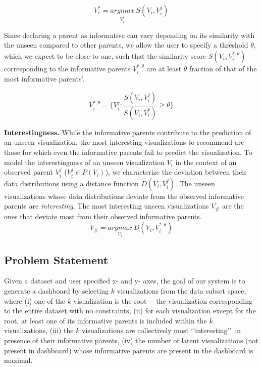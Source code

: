 \begin{equation}
    V_i^*=\underset{V_i^j}{argmax}\ S(V_i, V_i^j)
\end{equation}

Since declaring a parent as informative can vary depending on its similarity with the unseen compared to other parents, we allow the user to specify a threshold $\theta$, which we expect to be close to one, such that the similarity score $S(V_i, V_i^{*, \theta})$ corresponding to the informative parents $V_i^{*, \theta}$ are at least $\theta$ fraction of that of the most informative parents'.

\begin{equation}
    V_i^{*, \theta} = \{V_i^j : \frac{S(V_i, V_i^j)}{S(V_i, V_i^*)} \ge \theta\}
\end{equation}

\textbf{Interestingness.} While the informative parents contribute to the prediction of an unseen visualization, the most interesting visualizations to recommend are those for which even the informative parents fail to predict the visualization. To model the interestingness of an unseen visualization $V_i$ in the context of an observed parent $V_i^j$ ($V_i^j \in P(V_i)$), we characterize the deviation between their data distributions using a distance function $D(V_i, V_i^j)$. The unseen visualizations whose data distributions deviate from the observed informative parents are \emph{interesting}. The most interesting unseen visualizations $V_\#$ are the ones that deviate most from their observed informative parents.
\begin{equation}
    V_\#=\underset{V_i}{argmax} \ D(V_i, V_i^{*, \theta})
\end{equation}


\subsection{Problem Statement}

Given a dataset and user specified x- and y- axes, the goal of our system is to generate a dashboard by selecting $k$ visualizations from the data subset space, where (i) one of the $k$ visualization is the root--- the visualization corresponding to the entire dataset with no constraints, (ii) for each visualization except for the root, at least one of its informative parents is included within the $k$ visualizations, (iii) the $k$ visualizations are collectively most \lq\lq interesting\rq\rq\ in presence of their informative parents, (iv) the number of latent visualizations (not present in dashboard) whose informative parents are present in the dashboard is maximal.

